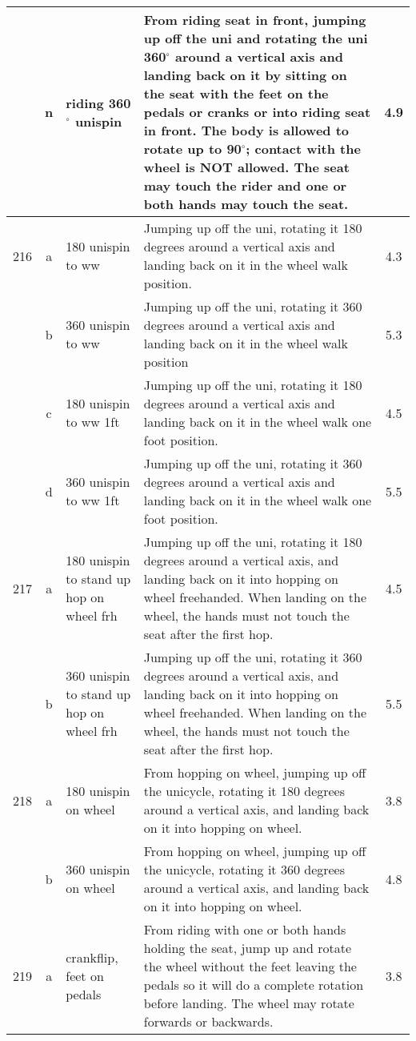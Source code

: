 \begin{longtable}{|r|c|p{4cm}|p{8cm}|c|}
\hline
  & n & riding 360$^\circ$ unispin & From riding seat in front, jumping up off the uni and rotating the uni 360$^\circ$ around a vertical axis and landing back on it by sitting on the seat with the feet on the pedals or cranks or into riding seat in front. The body is allowed to rotate up to 90$^\circ$; contact with the wheel is NOT allowed. The seat may touch the rider and one or both hands may touch the seat. & 4.9 \\ 
\hline
216 & a & 180 unispin to ww & Jumping up off the uni, rotating it 180 degrees around a vertical axis and landing back on it in the wheel walk position. & 4.3 \\ 
\hline
  & b & 360 unispin to ww & Jumping up off the uni, rotating it 360 degrees around a vertical axis and landing back on it in the wheel walk position  & 5.3 \\ 
\hline
  & c & 180 unispin to ww 1ft & Jumping up off the uni, rotating it 180 degrees around a vertical axis and landing back on it in the wheel walk one foot position.  & 4.5 \\ 
\hline
  & d & 360 unispin to ww 1ft & Jumping up off the uni, rotating it 360 degrees around a vertical axis and landing back on it in the wheel walk one foot position.  & 5.5 \\ 
\hline
217 & a & 180 unispin to stand up hop on wheel frh  & Jumping up off the uni, rotating it 180 degrees around a vertical axis, and landing back on it into hopping on wheel freehanded. When landing on the wheel, the hands must not touch the seat after the first hop.  & 4.5 \\ 
\hline
  & b & 360 unispin to stand up hop on wheel frh  & Jumping up off the uni, rotating it 360 degrees around a vertical axis, and landing back on it into hopping on wheel freehanded. When landing on the wheel, the hands must not touch the seat after the first hop.  & 5.5 \\ 
\hline
218 & a & 180 unispin on wheel  & From hopping on wheel, jumping up off the unicycle, rotating it 180 degrees around a vertical axis, and landing back on it into hopping on wheel. & 3.8 \\ 
\hline
  & b & 360 unispin on wheel  & From hopping on wheel, jumping up off the unicycle, rotating it 360 degrees around a vertical axis, and landing back on it into hopping on wheel. & 4.8 \\ 
\hline
219 & a & crankflip, feet on pedals & From riding with one or both hands holding the seat, jump up and rotate the wheel without the feet leaving the pedals so it will do a complete rotation before landing. The wheel may rotate forwards or backwards. & 3.8 \\ 

\end{longtable}
